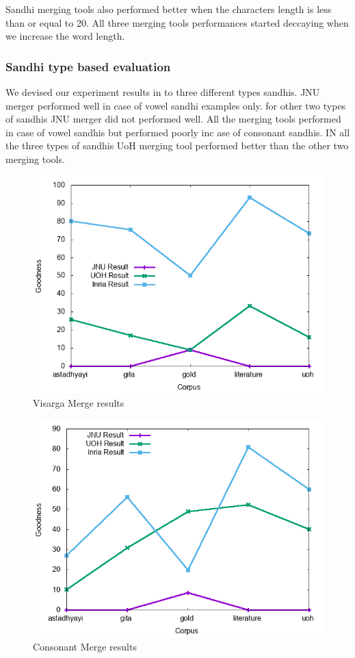 \documentclass[11pt]{article}
\begin{document}
Sandhi merging tools also performed better when the characters length is less than or equal to 20. All three merging tools performances started deccaying when we increase the word length.
\subsubsection{Sandhi type based evaluation}
We devised our experiment results in to three different types sandhis. JNU merger performed well in case of vowel sandhi examples only. for other two types of sandhis JNU merger did not performed well. All the merging tools performed in case of vowel sandhis but performed poorly inc ase of consonant sandhis. IN all the three types of sandhis UoH merging tool performed better than the other two merging tools.
\begin{figure}[h]
	\center
	\includegraphics[scale=0.34]{images/visargamerge.png}
	\caption{\label{screen}Visarga Merge results}
\end{figure}

\begin{figure}[h]
	\center
	\includegraphics[scale=0.34]{images/consonantmerge.png}
	\caption{\label{screen}Consonant Merge results}
\end{figure}
\end{document}
